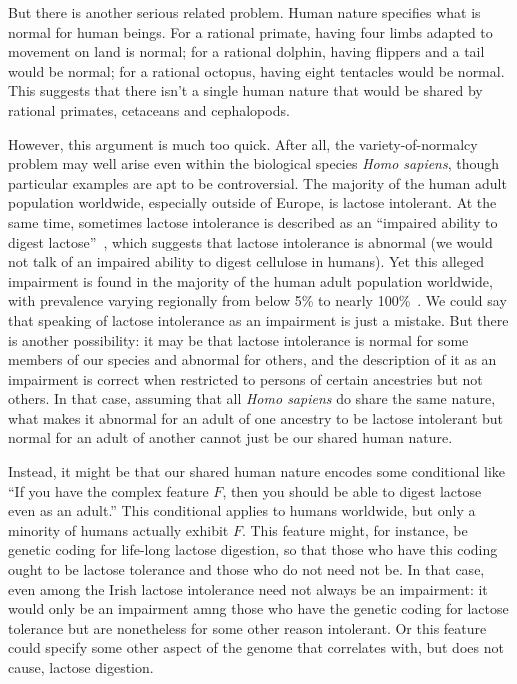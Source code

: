 But there is another serious related problem. Human nature specifies what is normal for human beings. For a rational
primate, having four limbs adapted to movement on land is normal; for a rational dolphin, having flippers and a tail would be 
normal; for a rational octopus, having eight tentacles would be normal. This suggests that there isn't a single human nature
that would be shared by rational primates, cetaceans and cephalopods. 

However, this argument is much too quick. After all, the variety-of-normalcy problem may well arise even within the 
biological species \textit{Homo sapiens}, though particular examples are apt to be controversial. 
The majority of the human adult population worldwide, especially outside of Europe, is lactose intolerant.
At the same time, sometimes lactose intolerance is described as an ``impaired ability to digest lactose''~\parencite{CDHF},
which suggests that lactose intolerance is abnormal (we would not talk of an impaired ability to digest cellulose in humans).
Yet this alleged impairment is found in the majority of the human adult population worldwide, with prevalence
varying regionally from below 5\% to nearly 100\%~\parencite{Sahi1994}.
We could say that speaking of lactose intolerance as an impairment is just a mistake. But there is another possibility: it may be that lactose intolerance is normal for some members of our species and abnormal for others, and the description 
of it as an impairment is correct when restricted to persons of certain ancestries but not others.
In that case, assuming that all \textit{Homo sapiens} do share the same nature, what makes it abnormal for an adult
of one ancestry to be lactose intolerant but normal for an adult of another 
cannot just be our shared human nature. 

Instead, it might be that our shared human nature encodes some conditional like ``If you have the complex feature $F$, then you
should be able to digest lactose even as an adult.'' This conditional applies to humans worldwide, but only a minority of humans
actually exhibit $F$. This feature might, for instance, be genetic coding for life-long lactose digestion, so that those
who have this coding ought to be lactose tolerance and those who do not need not be. In that case, even among the Irish lactose intolerance
need not always be an impairment: it would only be an impairment amng those who have the genetic coding for lactose tolerance but are
nonetheless for some other reason intolerant. Or this feature could specify some other aspect of the genome that correlates with, but
does not cause, lactose digestion.

